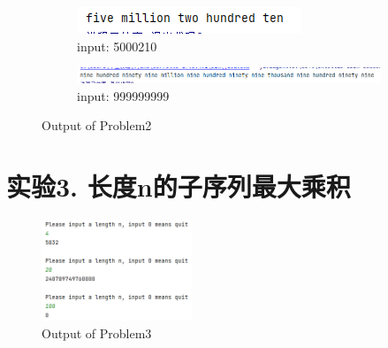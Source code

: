 \begin{figure}[H]
\begin{subfigure}{0.27\linewidth}
            \centering
            \includegraphics[width=1\linewidth]{../pic/2/2.5.png}
            \caption{input: 5000210}
        \end{subfigure}
        \begin{subfigure}{1\linewidth}
            \centering
            \includegraphics[width=0.9\linewidth]{../pic/2/2.6.png}
            \caption{input: 999999999}
        \end{subfigure}
        \caption{Output of Problem2}
    \end{figure}

\newpage
\section{实验3. 长度n的子序列最大乘积}
    
    \begin{figure}[H]
        \centering
        \includegraphics[width = 0.4\textwidth]{../pic/3/3.1.png}
        \caption{Output of Problem3}
    \end{figure}

\newpage
